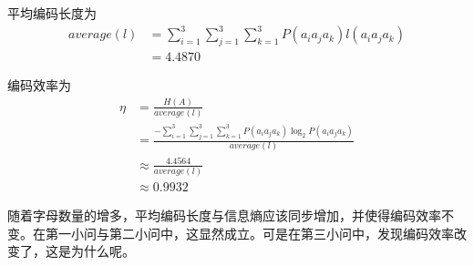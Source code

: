 \documentclass{ctexart}
\begin{document}
\begin{enumerate}
    平均编码长度为
    \begin{align}
        average(l) &= \sum_{i=1}^3\sum_{j=1}^3\sum_{k=1}^3 P(a_ia_ja_k)l(a_ia_ja_k) \\
        &= 4.4870
    \end{align}

    编码效率为
    \begin{align}
        \eta &= \frac{H(A)}{average(l)} \\
        &= \frac{-\sum_{i=1}^3\sum_{j=1}^3\sum_{k=1}^3 P(a_ia_ja_k)\log_2 P(a_ia_ja_k)}{average(l)} \\
        &\approx \frac{4.4564}{average(l)} \\
        &\approx 0.9932
    \end{align}

    随着字母数量的增多，平均编码长度与信息熵应该同步增加，并使得编码效率不变。在第一小问与第二小问中，这显然成立。可是在第三小问中，发现编码效率改变了，这是为什么呢。
\end{enumerate}
\end{document}
